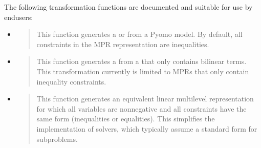 \documentclass[letterpaper,10pt,english]{sphinxmanual}
\begin{document}
The following transformation functions are documented and suitable for use by end\sphinxhyphen{}users:
\begin{itemize}
\item {} 
{\hyperref[\detokenize{reference/pyomo:pao.pyomo.convert.convert_pyomo2MultilevelProblem}]{}}
\begin{quote}

This function generates a {\hyperref[\detokenize{reference/mpr:pao.mpr.repn.LinearMultilevelProblem}]{}} or
{\hyperref[\detokenize{reference/mpr:pao.mpr.repn.QuadraticMultilevelProblem}]{}} from a Pyomo model.  By default,
all constraints in the MPR representation are inequalities.
\end{quote}

\item {} 
{\hyperref[\detokenize{reference/mpr:pao.mpr.convert_repn.linearize_bilinear_terms}]{}}
\begin{quote}

This function generates a {\hyperref[\detokenize{reference/mpr:pao.mpr.repn.LinearMultilevelProblem}]{}} from a {\hyperref[\detokenize{reference/mpr:pao.mpr.repn.QuadraticMultilevelProblem}]{}}
that only contains bilinear terms.  This transformation currently is limited to
MPRs that only contain inequality constraints.
\end{quote}

\item {} 
{\hyperref[\detokenize{reference/mpr:pao.mpr.convert_repn.convert_to_standard_form}]{}}
\begin{quote}

This function generates an equivalent linear multilevel representation for which all
variables are non\sphinxhyphen{}negative and all constraints have the same form (inequalities or equalities).
This simplifies the implementation of solvers, which typically assume a standard form
for subproblems.
\end{quote}

\end{itemize}
\end{document}
